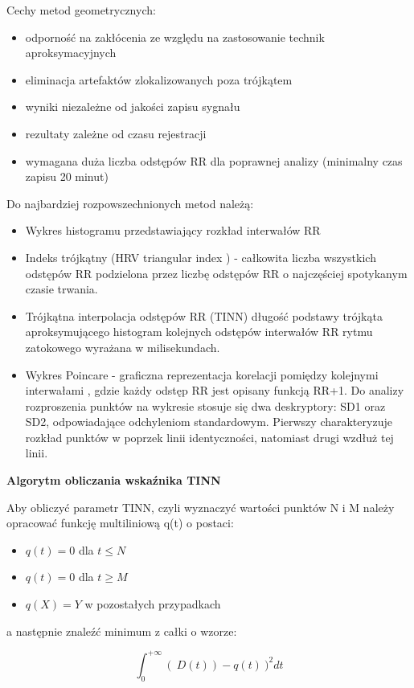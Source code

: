 \documentclass[a4paper, 11pt]{article}
\begin{document}
Cechy metod geometrycznych: 
\begin{itemize}
\item odporność na zakłócenia ze względu na zastosowanie technik aproksymacyjnych
\item eliminacja artefaktów zlokalizowanych poza trójkątem 
\item wyniki niezależne od jakości zapisu sygnału 
\item rezultaty zależne od czasu rejestracji 
\item wymagana duża liczba odstępów RR dla poprawnej analizy (minimalny
czas zapisu \textendash{} 20 minut) 
\end{itemize}
Do najbardziej rozpowszechnionych metod należą: 
\begin{itemize}
\item Wykres histogramu przedstawiający rozkład interwałów RR
\item Indeks trójkątny (HRV triangular index ) - całkowita liczba wszystkich
odstępów RR podzielona przez liczbę odstępów RR o najczęściej spotykanym
czasie trwania. 
\item Trójkątna interpolacja odstępów RR (TINN) \textendash{} długość podstawy
trójkąta aproksymującego histogram kolejnych odstępów interwałów RR
rytmu zatokowego wyrażana w milisekundach. 
\item Wykres Poincare - graficzna reprezentacja korelacji pomiędzy kolejnymi
interwałami , gdzie każdy odstęp RR jest opisany funkcją RR+1. Do
analizy rozproszenia punktów na wykresie stosuje się dwa deskryptory:
SD1 oraz SD2, odpowiadające odchyleniom standardowym. Pierwszy charakteryzuje
rozkład punktów w poprzek linii identyczności, natomiast drugi wzdłuż
tej linii.
\end{itemize}
\textbf{Algorytm obliczania wskaźnika TINN \cite{hrv2-eng}}

Aby obliczyć parametr TINN, czyli wyznaczyć wartości punktów N i M
należy opracować funkcję multiliniową q(t) o postaci:
\begin{itemize}
\item $q(t) = 0$ dla \ensuremath{t \le N}
\item $q(t) = 0$ dla \ensuremath{t \ge M} 
\item $q(X) = Y$ w pozostałych przypadkach
\end{itemize}
a następnie znaleźć minimum z całki o wzorze:

\begin{equation}
\int_{0}^{+\infty}\left(\: D(t)\right)-q(t)\:)^{2}dt
\end{equation}
\end{document}
